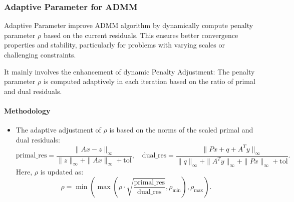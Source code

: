 \documentclass{article}
\begin{document}
\subsubsection{Adaptive Parameter for ADMM}
Adaptive Parameter improve ADMM algorithm by dynamically compute penalty parameter $\rho$ based on the current residuals. This ensures better convergence properties and stability, particularly for problems with varying scales or challenging constraints.

It mainly involves the enhancement of dynamic Penalty Adjustment: The penalty parameter $\rho$ is computed adaptively in each iteration based on the ratio of primal and dual residuals.


\paragraph{Methodology}
\begin{itemize}
    \item The adaptive adjustment of $\rho$ is based on the norms of the scaled primal and dual residuals:
\[
\text{primal\_res} = \frac{\|A x - z\|_\infty}{\|z\|_\infty + \|A x\|_\infty + \text{tol}}, \quad 
\text{dual\_res} = \frac{\|P x + q + A^T y\|_\infty}{\|q\|_\infty + \|A^T y\|_\infty + \|P x\|_\infty + \text{tol}}.
\]
Here, $\rho$ is updated as:
\[
\rho = \min\left(\max\left(\rho \cdot \sqrt{\frac{\text{primal\_res}}{\text{dual\_res}}}, \rho_{\min}\right), \rho_{\max}\right).
\]

\end{itemize}
\end{document}
